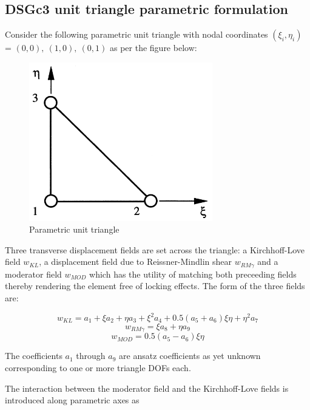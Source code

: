 \subsection{DSGc3 unit triangle parametric formulation}
Consider the following parametric unit triangle with nodal coordinates $(\xi_i,\eta_i)$ = $(0,0),\ (1,0),\ (0,1)$ as per the figure below:

\begin{figure}[H]
	\centering
	\includegraphics[width=8cm]{images/parametric_unit_triangle.png}
	\caption{Parametric unit triangle \cite{Ble00}}
	\label{fig:parametric_unit_triangle}
\end{figure}

Three transverse displacement fields are set across the triangle: a Kirchhoff-Love field $w_{KL}$, a displacement field due to Reissner-Mindlin shear $w_{RM \gamma}$ and a moderator field $w_{MOD}$ which has the utility of matching both preceeding fields thereby rendering the element free of locking effects. The form of the three fields are:

\begin{equation} 
w_{KL} = a_1 + \xi a_2 + \eta a_3 + \xi^2 a_4 + 0.5(a_5 + a_6)\xi \eta + \eta^2 a_7
\label{eqDSGc3_1}
\end{equation}
\begin{equation} 
w_{RM \gamma} = \xi a_8 + \eta a_9
\label{eqDSGc3_2}
\end{equation}
\begin{equation} 
w_{MOD} = 0.5(a_5 - a_6)\xi \eta
\label{eqDSGc3_3}
\end{equation}

The coefficients $a_1$ through $a_9$ are ansatz coefficients as yet unknown corresponding to one or more triangle DOFs each.

The interaction between the moderator field and the Kirchhoff-Love fields is introduced along parametric axes as

